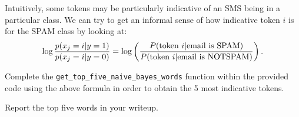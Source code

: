 \item {}
Intuitively, some tokens may be particularly indicative of an SMS being
in a particular class.  We can try to get an informal sense of how indicative
token $i$ is for the SPAM class by looking at:
\begin{equation*}
  \log \frac{p(x_j = i| y=1)}{p(x_j = i|y=0)}
  = \log\left(\frac{P(\hbox{token $i$} | \hbox{email is SPAM})}
    {P(\hbox{token $i$} | \hbox{email is NOTSPAM})}\right).
\end{equation*}

Complete the \texttt{get\_top\_five\_naive\_bayes\_words} function within the provided code using the above formula in order to obtain the 5 most indicative tokens.

Report the top five words in your writeup.\\[50pt]